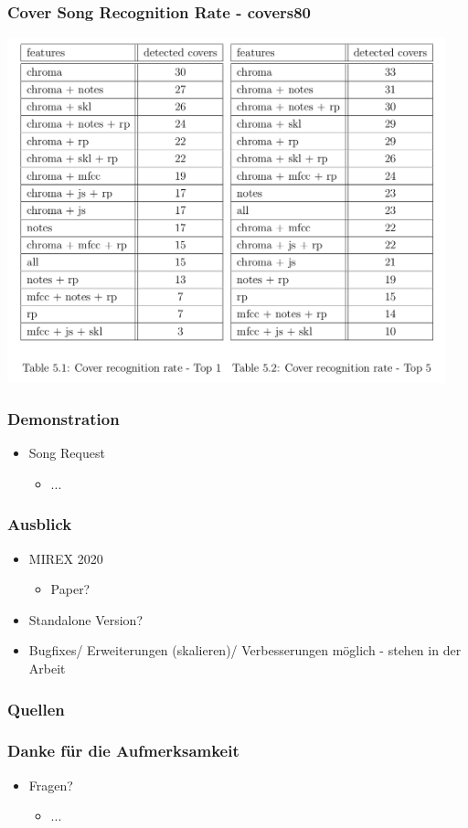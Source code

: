 \documentclass[12pt]{FSUBeamer_official}
\begin{document}
\begin{frame}
	\frametitle{Cover Song Recognition Rate - covers80}
	\begin{minipage}[b]{0.75\linewidth}
		\centering
		\includegraphics[width=0.95\textwidth]{pics/SparkFeat/covers.png}	
	\end{minipage}
\end{frame}

\begin{frame}
	\frametitle{Demonstration}
	\begin{itemize}
		\item Song Request 
		\begin{itemize}
			\item ...
		\end{itemize}
	\end{itemize}
\end{frame}

\begin{frame}
	\frametitle{Ausblick}
	\begin{itemize}
		\item MIREX 2020
		\begin{itemize}
			\item Paper?
		\end{itemize}
		\item Standalone Version?
		\item Bugfixes/ Erweiterungen (skalieren)/ Verbesserungen möglich - stehen in der Arbeit
	\end{itemize}
\end{frame}

\begin{frame}
	\frametitle{Quellen}
	
		
\end{frame}

\begin{frame}
	\frametitle{Danke für die Aufmerksamkeit}
	\begin{itemize}
		\item Fragen?
		\begin{itemize}
			\item ...
		\end{itemize}
	\end{itemize}
\end{frame}
\end{document}
